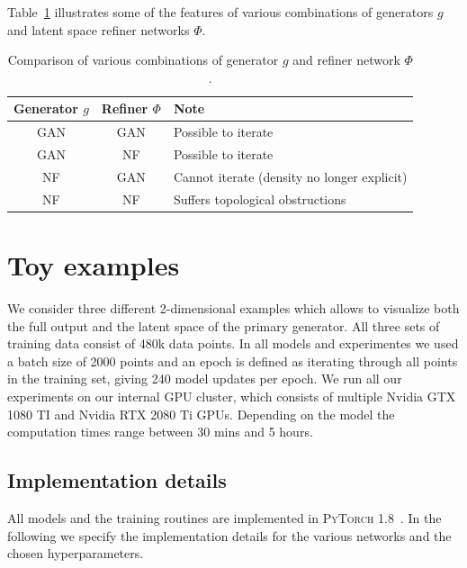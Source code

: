 Table~\ref{tab:refiner_comparison} illustrates some of the features of various combinations of generators $g$ and latent space refiner networks $\Phi$.

\begin{table}[!htbp]
  \caption{Comparison of various combinations of generator $g$ and refiner network $\Phi$.}
  \label{tab:refiner_comparison}
  \centering
  \begin{tabular}{ccl}
    \toprule
      \parbox{2cm}{\centering Generator $g$} & \parbox{2cm}{\centering Refiner $\Phi$} & \parbox{5cm}{Note}\\
    \midrule
     GAN & GAN &  Possible to iterate \\
     GAN & NF &  Possible to iterate \\
     NF & GAN &  Cannot iterate (density no longer explicit)\\
     NF & NF &  Suffers topological obstructions \\
    \bottomrule
  \end{tabular}
\end{table}

\section{Toy examples}
\label{sec:examples}

We consider three different 2-dimensional examples which allows to visualize both the full output and the latent space of the primary generator.
All three sets of training data consist of 480k data points. In all models and experimentes we used a batch size of 2000 points and an epoch is defined as iterating through all points in the training set, giving 240 model updates per epoch. We run all our experiments on
our internal GPU cluster, which consists of multiple Nvidia GTX 1080 TI and Nvidia RTX 2080 Ti GPUs. Depending on the model the computation times range between 30 mins and 5 hours.

\subsection{Implementation details}
\label{sec:implementation_details}

All models and the training routines are implemented in \textsc{PyTorch} 1.8~\cite{Pytorch2019}. In the following we specify the implementation details for the various networks and the chosen hyperparameters.

